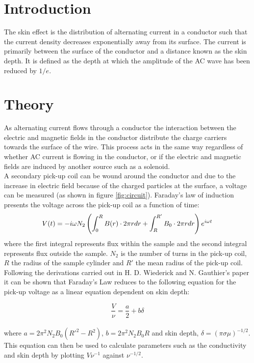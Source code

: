 \documentclass[a4paper,12pt,twocolumn]{article}
\let\cite=\supercite
\begin{document}
\section{Introduction}
	The skin effect is the distribution of alternating current in a conductor such that the current density decreases exponentially away from its surface. The current is primarily between the surface of the conductor and a distance known as the skin depth. It is defined as the depth at which the amplitude of the AC wave has been reduced by $1/e$\cite{geosci}.
	
\section{Theory}

	As alternating current flows through a conductor the interaction between the electric and magnetic fields in the conductor distribute the charge carriers towards the surface of the wire\cite{hyperPhysics}. This process acts in the same way regardless of whether AC current is flowing in the conductor, or if the electric and magnetic fields are induced by another source such as a solenoid\cite{jackson}.\\
	
	A secondary pick-up coil can be wound around the conductor and due to the increase in electric field because of the charged particles at the surface, a voltage can be measured (as shown in figure \ref{fig:circuit}). Faraday's law of induction presents the voltage across the pick-up coil as a function of time\cite{jackson}:
	\begin{equation}
		\scriptsize
		V(t) = - i \omega N_2 \left( \int_{0}^{R} B(r) \cdot 2\pi r dr + \int_{R}^{R'} B_0 \cdot 2\pi r dr \right) e^{i\omega t}
		\label{eq:faraday}
	\end{equation}
	where the first integral represents flux within the sample and the second integral represents flux outside the sample. $N_2$ is the number of turns in the pick-up coil, $R$ the radius of the sample cylinder and $R'$ the mean radius of the pick-up coil.\\
	
	Following the derivations carried out in H. D. Wiederick and N. Gauthier's paper\cite{manual} it can be shown that Faraday's Law reduces to the following equation for the pick-up voltage as a linear equation dependent on skin depth:
	
	\begin{equation}
		\frac{V}{\nu} = \frac{a}{2} + b\delta
		\label{eq:line}
	\end{equation}\\
	where $a = 2\pi^2 N_2 B_0 (R'^2-R^2)$, $b = 2\pi^2 N_2 B_0 R$ and skin depth, $\delta = (\pi \sigma \mu)^{-1/2}$. This equation can then be used to calculate parameters such as the conductivity and skin depth by plotting $V\nu^{-1}$ against $\nu^{-1/2}$.\\
	
\end{document}

